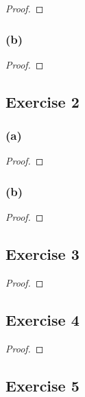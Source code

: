 \documentclass[14pt]{extarticle}
\begin{document}
\begin{proof}

\end{proof}

\subsubsection{(b)}

\begin{proof}

\end{proof}

\subsection{Exercise 2}

\subsubsection{(a)}

\begin{proof}

\end{proof}

\subsubsection{(b)}

\begin{proof}

\end{proof}

\subsection{Exercise 3}

\begin{proof}

\end{proof}

\subsection{Exercise 4}

\begin{proof}

\end{proof}

\subsection{Exercise 5}
\end{document}
